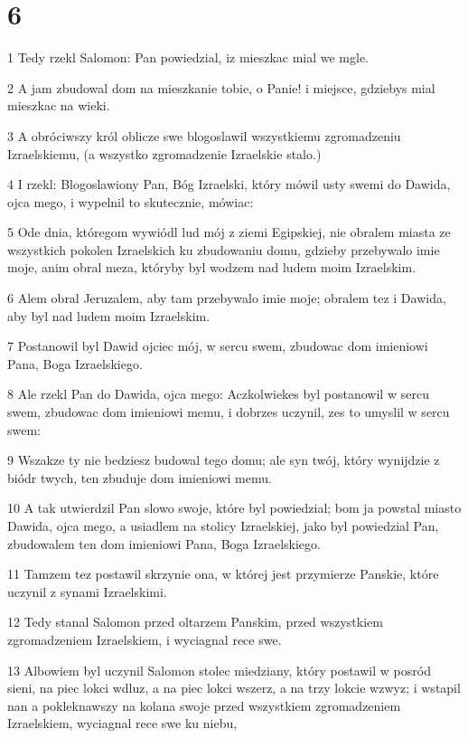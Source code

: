 \chapter{6}

\par 1 Tedy rzekl Salomon: Pan powiedzial, iz mieszkac mial we mgle.
\par 2 A jam zbudowal dom na mieszkanie tobie, o Panie! i miejsce, gdziebys mial mieszkac na wieki.
\par 3 A obróciwszy król oblicze swe blogoslawil wszystkiemu zgromadzeniu Izraelskiemu, (a wszystko zgromadzenie Izraelskie stalo.)
\par 4 I rzekl: Blogoslawiony Pan, Bóg Izraelski, który mówil usty swemi do Dawida, ojca mego, i wypelnil to skutecznie, mówiac:
\par 5 Ode dnia, któregom wywiódl lud mój z ziemi Egipskiej, nie obralem miasta ze wszystkich pokolen Izraelskich ku zbudowaniu domu, gdzieby przebywalo imie moje, anim obral meza, któryby byl wodzem nad ludem moim Izraelskim.
\par 6 Alem obral Jeruzalem, aby tam przebywalo imie moje; obralem tez i Dawida, aby byl nad ludem moim Izraelskim.
\par 7 Postanowil byl Dawid ojciec mój, w sercu swem, zbudowac dom imieniowi Pana, Boga Izraelskiego.
\par 8 Ale rzekl Pan do Dawida, ojca mego: Aczkolwiekes byl postanowil w sercu swem, zbudowac dom imieniowi memu, i dobrzes uczynil, zes to umyslil w sercu swem:
\par 9 Wszakze ty nie bedziesz budowal tego domu; ale syn twój, który wynijdzie z biódr twych, ten zbuduje dom imieniowi memu.
\par 10 A tak utwierdzil Pan slowo swoje, które byl powiedzial; bom ja powstal miasto Dawida, ojca mego, a usiadlem na stolicy Izraelskiej, jako byl powiedzial Pan, zbudowalem ten dom imieniowi Pana, Boga Izraelskiego.
\par 11 Tamzem tez postawil skrzynie ona, w której jest przymierze Panskie, które uczynil z synami Izraelskimi.
\par 12 Tedy stanal Salomon przed oltarzem Panskim, przed wszystkiem zgromadzeniem Izraelskiem, i wyciagnal rece swe.
\par 13 Albowiem byl uczynil Salomon stolec miedziany, który postawil w posród sieni, na piec lokci wdluz, a na piec lokci wszerz, a na trzy lokcie wzwyz; i wstapil nan a pokleknawszy na kolana swoje przed wszystkiem zgromadzeniem Izraelskiem, wyciagnal rece swe ku niebu,
